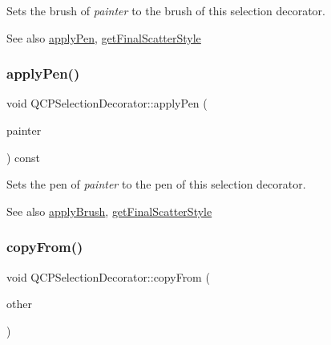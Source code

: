 Sets the brush of {\itshape painter} to the brush of this selection decorator.

\begin{DoxySeeAlso}{See also}
\hyperlink{class_q_c_p_selection_decorator_a75098893f7d08660ea449206810679d7}{apply\+Pen}, \hyperlink{class_q_c_p_selection_decorator_a1277b373248896bc70e8cc1de96da9fa}{get\+Final\+Scatter\+Style} 
\end{DoxySeeAlso}
\mbox{\label{class_q_c_p_selection_decorator_a75098893f7d08660ea449206810679d7}} 
\subsubsection{\texorpdfstring{apply\+Pen()}{applyPen()}}
{\footnotesize\ttfamily void Q\+C\+P\+Selection\+Decorator\+::apply\+Pen (\begin{DoxyParamCaption}\item[{\hyperlink{class_q_c_p_painter}{Q\+C\+P\+Painter} $\ast$}]{painter }\end{DoxyParamCaption}) const}

Sets the pen of {\itshape painter} to the pen of this selection decorator.

\begin{DoxySeeAlso}{See also}
\hyperlink{class_q_c_p_selection_decorator_a225544527d51b49546b70d0e6d655a34}{apply\+Brush}, \hyperlink{class_q_c_p_selection_decorator_a1277b373248896bc70e8cc1de96da9fa}{get\+Final\+Scatter\+Style} 
\end{DoxySeeAlso}
\mbox{\label{class_q_c_p_selection_decorator_a467a8d5cfcab27e862a17c797ac27b8a}} 
\subsubsection{\texorpdfstring{copy\+From()}{copyFrom()}}
{\footnotesize\ttfamily void Q\+C\+P\+Selection\+Decorator\+::copy\+From (\begin{DoxyParamCaption}\item[{const \hyperlink{class_q_c_p_selection_decorator}{Q\+C\+P\+Selection\+Decorator} $\ast$}]{other }\end{DoxyParamCaption})\hspace{0.3cm}{\ttfamily [virtual]}}


